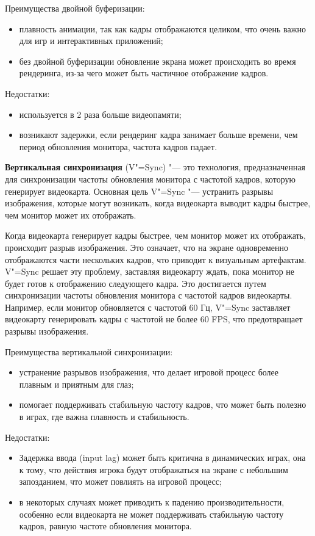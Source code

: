 Преимущества двойной буферизации:
\begin{itemize}
    \item плавность анимации, так как кадры отображаются целиком, что очень важно для игр и интерактивных приложений;
    \item без двойной буферизации обновление экрана может происходить во время рендеринга, из-за чего может быть частичное отображение кадров.
\end{itemize}

Недостатки:
\begin{itemize}
    \item используется в 2 раза больше видеопамяти;
    \item возникают задержки, если рендеринг кадра занимает больше времени, чем период обновления монитора, частота кадров падает.
\end{itemize}

\textbf{Вертикальная синхронизация} (V"=Sync) "--- это технология, предназначенная для синхронизации частоты обновления монитора с частотой кадров, которую генерирует видеокарта. Основная цель V"=Sync "--- устранить разрывы изображения, которые могут возникать, когда видеокарта выводит кадры быстрее, чем монитор может их отображать.

Когда видеокарта генерирует кадры быстрее, чем монитор может их отображать, происходит разрыв изображения. Это означает, что на экране одновременно отображаются части нескольких кадров, что приводит к визуальным артефактам. V"=Sync решает эту проблему, заставляя видеокарту ждать, пока монитор не будет готов к отображению следующего кадра. Это достигается путем синхронизации частоты обновления монитора с частотой кадров видеокарты. Например, если монитор обновляется с частотой 60 Гц, V"=Sync заставляет видеокарту генерировать кадры с частотой не более 60 FPS, что предотвращает разрывы изображения.

Преимущества вертикальной синхронизации:
\begin{itemize}
    \item устранение разрывов изображения, что делает игровой процесс более плавным и приятным для глаз;
    \item помогает поддерживать стабильную частоту кадров, что может быть полезно в играх, где важна плавность и стабильность.
\end{itemize}

Недостатки:
\begin{itemize}
    \item Задержка ввода (input lag) может быть критична в динамических играх, она к тому, что действия игрока будут отображаться на экране с небольшим запозданием, что может повлиять на игровой процесс;
    \item в некоторых случаях может приводить к падению производительности, особенно если видеокарта не может поддерживать стабильную частоту кадров, равную частоте обновления монитора.
\end{itemize}